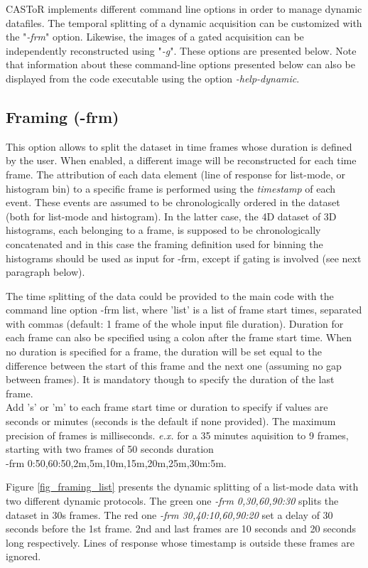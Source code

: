 \documentclass[a4paper, 11pt]{article}
\begin{document}
CASToR implements different command line options in order to manage dynamic datafiles. The temporal splitting of a dynamic acquisition can be customized with the "\textit{-frm}" option. Likewise, the images of a gated acquisition can be independently reconstructed using "\textit{-g}". These options are presented below. Note that information about these command-line options presented below can also be displayed from the code executable using the option \textit{-help-dynamic}.

\subsection{Framing (-frm)}
This option allows to split the dataset in time frames whose duration is defined by the user. When enabled, a different image will be reconstructed for each time frame. The attribution of each data element (line of response for list-mode, or histogram bin) to a specific frame is performed using the \textit{timestamp} of each event. These events are assumed to be chronologically ordered in the dataset (both for list-mode and histogram). In the latter case, the 4D dataset of 3D histograms, each belonging to a frame, is supposed to be chronologically concatenated and in this case the framing definition used for binning the histograms should be used as input for -frm, except if gating is involved (see next paragraph below).

The time splitting of the data could be provided to the main code with the command line option -frm list, where 'list' is a list of frame start times, separated with commas (default: 1 frame of the whole input file duration). Duration for each frame can also be specified using a colon after the frame start time. When no duration is specified for a frame, the duration will be set equal to the difference between the start of this frame and the next one (assuming no gap between frames). It is mandatory though to specify the duration of the last frame. \\
Add 's' or 'm' to each frame start time or duration to specify if values are seconds or minutes (seconds is the default if none provided). The maximum precision of frames is milliseconds. \textit{e.x.} for a 35 minutes aquisition to 9 frames, starting with two frames of 50 seconds duration \\ -frm 0:50,60:50,2m,5m,10m,15m,20m,25m,30m:5m.

Figure \ref{fig_framing_list} presents the dynamic splitting of a list-mode data with two different dynamic protocols. The green one \textit{-frm 0,30,60,90:30} splits the dataset in 30s frames. The red one \textit{-frm 30,40:10,60,90:20} set a delay of 30 seconds before the 1st frame. 2nd and last frames are 10 seconds and 20 seconds long respectively. Lines of response whose timestamp is outside these frames are ignored.
\end{document}
